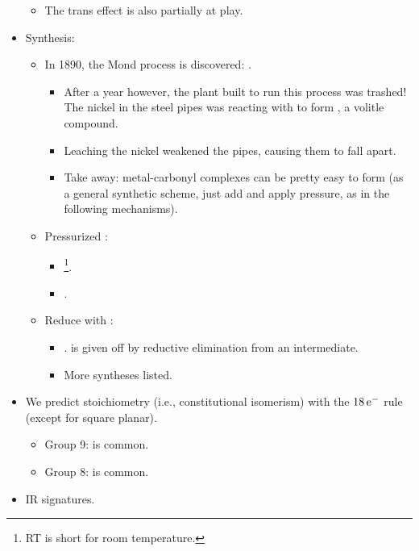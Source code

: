 \documentclass[../notes.tex]{subfiles}
\begin{document}
\begin{itemize}
    \begin{itemize}
        \item The trans effect is also partially at play.
    \end{itemize}
    \item Synthesis:
    \begin{itemize}
        \item In 1890, the Mond process is discovered: .
        \begin{itemize}
            \item After a year however, the plant built to run this process was trashed! The nickel in the steel pipes was reacting with  to form , a volitle compound.
            \item Leaching the nickel weakened the pipes, causing them to fall apart.
            \item Take away: metal-carbonyl complexes can be pretty easy to form (as a general synthetic scheme, just add  and apply pressure, as in the following mechanisms).
        \end{itemize}
        \item Pressurized :
        \begin{itemize}
            \item {}\footnote{RT is short for room temperature.}.
            \item {}.
        \end{itemize}
        \item Reduce with :
        \begin{itemize}
            \item {}.  is given off by reductive elimination from an intermediate.
            \item More syntheses listed.
        \end{itemize}
    \end{itemize}
    \item We predict stoichiometry (i.e., constitutional isomerism) with the $18\,\e[-]$ rule (except for square planar).
    \begin{itemize}
        \item Group 9:  is common.
        \item Group 8:  is common.
    \end{itemize}
    \item IR signatures.

\end{itemize}
\end{document}
